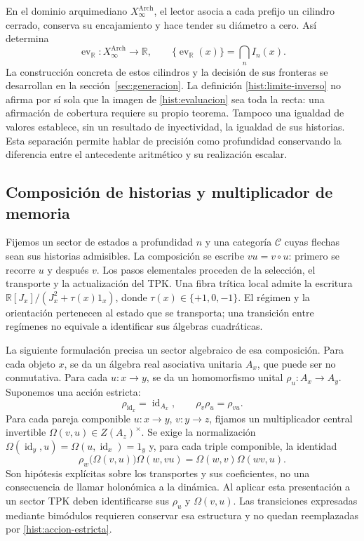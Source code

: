 En el dominio arquimediano \(X_\infty^{\mathrm{Arch}}\), el lector asocia
a cada prefijo un cilindro cerrado, conserva su encajamiento y hace tender
su diámetro a cero. Así determina
\begin{equation}
 \operatorname{ev}_{\mathbb R}:X_\infty^{\mathrm{Arch}}\longrightarrow
 \mathbb R,\qquad
 \{\operatorname{ev}_{\mathbb R}(x)\}=\bigcap_n I_n(x).
 \label{hist:evaluacion}
\end{equation}
La construcción concreta de estos cilindros y la decisión de sus fronteras
se desarrollan en la sección~\ref{sec:generacion}. La definición
\eqref{hist:limite-inverso} no afirma por sí sola que la imagen de
\eqref{hist:evaluacion} sea toda la recta: una afirmación de cobertura
requiere su propio teorema. Tampoco una igualdad de valores establece, sin
un resultado de inyectividad, la igualdad de sus historias. Esta separación
permite hablar de precisión como profundidad conservando la diferencia
entre el antecedente aritmético y su realización escalar.

\subsection{Composición de historias y multiplicador de memoria}
\label{hist:algebra}

Fijemos un sector de estados a profundidad \(n\) y una categoría
\(\mathcal C\) cuyas flechas sean sus historias admisibles. La composición
se escribe \(vu=v\circ u\): primero se recorre \(u\) y después \(v\).
Los pasos elementales proceden de la selección, el transporte y la
actualización del TPK. Una fibra trítica local admite la escritura
\(\mathbb R[J_x]/(J_x^2+\tau(x)1_x)\), donde
\(\tau(x)\in\{+1,0,-1\}\). El régimen y la orientación pertenecen al
estado que se transporta; una transición entre regímenes no equivale a
identificar sus álgebras cuadráticas.

La siguiente formulación precisa un sector algebraico de esa composición.
Para cada objeto \(x\), se da un álgebra real asociativa unitaria \(A_x\),
que puede ser no conmutativa. Para cada \(u:x\to y\), se da un
homomorfismo unital \(\rho_u:A_x\to A_y\). Suponemos una acción estricta:
\begin{equation}
 \rho_{\operatorname{id}_x}=\operatorname{id}_{A_x},\qquad
 \rho_v\rho_u=\rho_{vu}.
 \label{hist:accion-estricta}
\end{equation}
Para cada pareja componible \(u:x\to y\), \(v:y\to z\), fijamos un
multiplicador central invertible
\(\Omega(v,u)\in Z(A_z)^\times\). Se exige la normalización
\(\Omega(\operatorname{id}_y,u)=\Omega(u,\operatorname{id}_x)=1_y\)
y, para cada triple componible, la identidad
\begin{equation}
 \rho_w\bigl(\Omega(v,u)\bigr)\Omega(w,vu)
   =\Omega(w,v)\Omega(wv,u).
 \label{hist:cociclo}
\end{equation}
Son hipótesis explícitas sobre los transportes y sus coeficientes, no una
consecuencia de llamar holonómica a la dinámica. Al aplicar esta presentación
a un sector TPK deben identificarse sus \(\rho_u\) y \(\Omega(v,u)\).
Las transiciones expresadas mediante bimódulos requieren conservar esa
estructura y no quedan reemplazadas por \eqref{hist:accion-estricta}.

